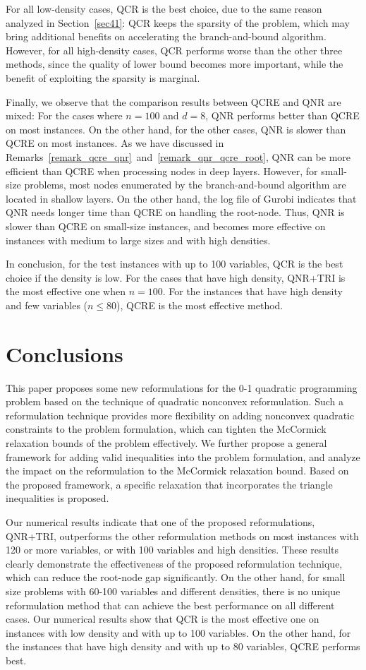 \documentclass[pdflatex,sn-mathphys-num]{sn-jnl}%
\theoremstyle{thmstyleone}%
\theoremstyle{thmstyletwo}%
\theoremstyle{thmstylethree}%
\begin{document}
For all low-density cases, QCR is the best choice, due to the same reason analyzed in Section~\ref{sec41}: QCR keeps the sparsity of the problem, which may bring additional benefits on accelerating the branch-and-bound algorithm. However, for all high-density cases, QCR performs worse than the other three methods, since the quality of lower bound becomes more important, while the benefit of exploiting the sparsity is marginal.

Finally, we observe that the comparison results between QCRE and QNR are mixed: For the cases where $n=100$ and $d=8$, QNR performs better than QCRE on most instances. On the other hand, for the other cases, QNR is slower than QCRE on most instances. As we have discussed in Remarks~\ref{remark_qcre_qnr}~and~\ref{remark_qnr_qcre_root}, QNR can be more efficient than QCRE when processing nodes in deep layers. However, for small-size problems, most nodes enumerated by the branch-and-bound algorithm are located in shallow layers. On the other hand, the log file of Gurobi indicates that QNR needs longer time than QCRE on handling the root-node. Thus, QNR is slower than QCRE on small-size instances, and becomes more effective on instances with medium to large sizes and with high densities.

In conclusion, for the test instances with up to 100 variables, QCR is the best choice if the density is low. For the cases that have high density, QNR+TRI is the most effective one when $n=100$. For the instances that have high density and few variables ($n\leq 80$), QCRE is the most effective method.

\section{Conclusions}

This paper proposes some new reformulations for the 0-1 quadratic programming problem based on the technique of quadratic nonconvex reformulation. Such a reformulation technique provides more flexibility on adding nonconvex quadratic constraints to the problem formulation, which can tighten the McCormick relaxation bounds of the problem effectively. We further propose a general framework for adding valid inequalities into the problem formulation, and analyze the impact on the reformulation to the McCormick relaxation bound. Based on the proposed framework, a specific relaxation that incorporates the triangle inequalities is proposed.

Our numerical results indicate that one of the proposed reformulations, QNR+TRI, outperforms the other reformulation methods on most instances with 120 or more variables, or with 100 variables and high densities. These results clearly demonstrate the effectiveness of the proposed reformulation technique, which can reduce the root-node gap significantly. On the other hand, for small size problems with 60-100 variables and different densities, there is no unique reformulation method that can achieve the best performance on all different cases. Our numerical results show that QCR is the most effective one on instances with low density and with up to 100 variables. On the other hand, for the instances that have high density and with up to 80 variables, QCRE performs best.
\end{document}
